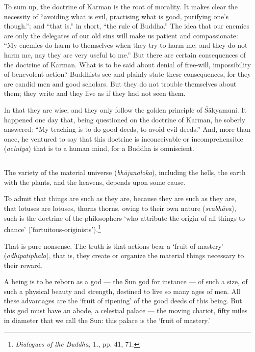 \documentclass[a4paper, 11pt, oneside, english]{article}
\begin{document}
To sum up, the doctrine of Karman is the root of morality. It makes clear the necessity of ``avoiding what is evil, practising what is good, purifying one's though.''; and ``that is.'' in short, ``the rule of Buddha.'' The idea that our enemies are only the delegates of our old sins will make us patient and compassionate: ``My enemies do harm to themselves when they try to harm me; and they do not harm me, nay they are very useful to me.'' But there are certain consequences of the doctrine of Karman. What is to be said about denial of free-will, impossibility of benevolent action? Buddhists see and plainly state these consequences, for they are candid men and good scholars. But they do not trouble themselves about them; they write and they live as if they had not seen them.

In that they are wise, and they only follow the golden principle of Śākyamuni. It happened one day that, being questioned on the doctrine of Karman, he soberly answered: ``My teaching is to do good deeds, to avoid evil deeds.'' And, more than once, he ventured to say that this doctrine is inconceivable or incomprehensible (\emph{acintya}) that is to a human mind, for a Buddha is omniscient.

\subsection{}
\paragraph{}
The variety of the material universe (\emph{bhājanaloka}), including the hells, the earth with the plants, and the heavens, depends upon some cause.

To admit that things are such as they are, because they are such as they are, that lotuses are lotuses, thorns thorns, owing to their own nature (\emph{svabhāva}), such is the doctrine of the philosophers `who attribute the origin of all things to chance' ('fortuitous-originists').\footnote{\emph{Dialogues of the Buddha}, 1., pp. 41, 71.}

That is pure nonsense. The truth is that actions bear a `fruit of mastery' (\emph{adhipatiphala}), that is, they create or organize the material things necessary to their reward.

A being is to be reborn as a god --- the Sun god for instance --- of such a size, of such a physical beauty and strength, destined to live so many ages of men. All these advantages are the `fruit of ripening' of the good deeds of this being. But this god must have an abode, a celestial palace --- the moving chariot, fifty miles in diameter that we call the Sun: this palace is the `fruit of mastery.'
\end{document}
